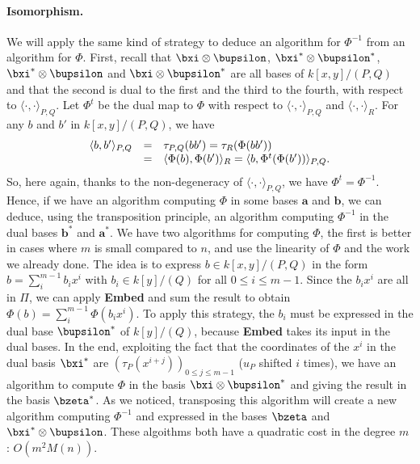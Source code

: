 \documentclass[a4paper,11pt]{article}
\theoremstyle{break}
\theoremstyle{definition}
\theoremstyle{remark}
\newcommand{\ps}[2]{\langle#1,#2\rangle}
\newcommand{\psdot}{\ps{\cdot}{\cdot}}
\begin{document}
\paragraph{Isomorphism.} We will apply the same kind of strategy to deduce an 
algorithm for $\Phi^{-1}$ from an algorithm for $\Phi$. First, recall that 
$\bxi\otimes\bupsilon$, $\bxi^*\otimes\bupsilon^*$, $\bxi^*\otimes\bupsilon$ 
and $\bxi\otimes\bupsilon^*$ are all bases of $k[x,y]/(P,Q)$ and that the 
second is dual to the first and the third to the fourth, with respect to 
$\psdot_{P,Q}$. Let $\Phi^t$ be the dual map to $\Phi$ with respect to 
$\psdot_{P,Q}$ and $\psdot_R$. For any $b$ and $b'$ in $k[x,y]/(P,Q)$, we have
\[
\begin{array}[here]{rcl}
  \ps{b}{b'}_{P,Q} &=& \tau_{P,Q}(bb') = \tau_R(\Phi(bb')) \\
  &=& \ps{\Phi(b)}{\Phi(b')}_R = \ps{b}{\Phi^t(\Phi(b'))}_{P,Q}.
\end{array}
\]
So, here again, thanks to the non-degeneracy of $\psdot_{P,Q}$, we have 
$\Phi^t=\Phi^{-1}$. Hence, if we have an algorithm computing $\Phi$ in  
some bases $\textbf{a}$ and $\textbf{b}$, we can deduce, using the 
transposition principle, an algorithm computing $\Phi^{-1}$ in the dual bases 
$\textbf{b}^*$ and $\textbf{a}^*$. We have two algorithms for computing $\Phi$, 
the first is better in cases where $m$ is small compared to $n$, and use the 
linearity of $\Phi$ and the work we already done. The idea is to express $b\in 
k[x,y]/(P,Q)$ in the form $b=\sum_i^{m-1}b_ix^i$ with $b_i\in k[y]/(Q)$ for all 
$0\leq i \leq m-1$. Since the $b_ix^i$ are all in $\Pi$, we can apply 
\textbf{Embed} and sum the result to obtain $\Phi(b)=\sum_i^{m-1}\Phi(b_ix^i)$. 
To apply this strategy, the $b_i$ must be expressed in the dual base 
$\bupsilon^*$ of $k[y]/(Q)$, because \textbf{Embed} takes its input in the dual 
bases. In the end, exploiting the fact that the coordinates of the $x^i$ in the 
dual basis $\bxi^*$ are $(\tau_P(x^{i+j}))_{0\leq j\leq m-1}$ ($u_P$ shifted 
$i$ times), we have an algorithm to compute $\Phi$ in the basis 
$\bxi\otimes\bupsilon^*$ and giving the result in the basis $\bzeta^*$. As we 
noticed, transposing this algorithm will create a new algorithm computing 
$\Phi^{-1}$ and expressed in the bases $\bzeta$ and $\bxi^*\otimes\bupsilon$. 
These algoithms both have a quadratic cost in the degree $m$ : $O(m^2M(n))$.
\end{document}

